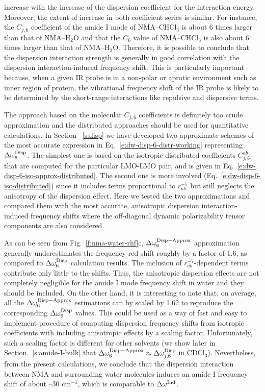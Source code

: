\documentclass[b5paper,oneside,fleqn,11pt]{book}
\begin{document}
\begin{refsection}
increase with the increase of the dispersion coefficient for the interaction
energy. Moreover, the extent of increase in both coefficient series
is similar. For instance, the $C_{j,6}$ coefficient of the
amide I mode of NMA--CHCl$_3$ is about 6 times larger than
that of NMA--H$_2$O and that the $C_6$ value of NMA--CHCl$_3$ is
also about 6 times larger than that of NMA--H$_2$O. Therefore,
it is possible to conclude that the dispersion interaction
strength is generally in good correlation with the dispersion
interaction\hyp{}induced frequency shift. This is particularly important
because, when a given IR probe is in a non\hyp{}polar or aprotic
environment such as inner region of protein, the vibrational
frequency shift of the IR probe is likely to be determined
by the short\hyp{}range interactions like repulsive and dispersive
terms.

The approach based on the molecular $C_{j,6}$ coefficients 
is definitely too crude approximation and the distributed approaches
should be used for quantitative calculations. 
In Section ~\ref{s:disp} we have developed two
approximate schemes of the most accurate expression in Eq.~\eqref{e:dw-disp-6-distr-working}
representing $\Delta\omega^{\rm Disp}_6$. The simplest
one is based on the isotropic distributed coefficients $C_{j,6}^{ab}$
that are computed for the particular LMO-LMO pair, and is given
in Eq.~\eqref{e:dw-disp-6-iso-approx-distributed}. 
The second one is more involved (Eq.~\eqref{e:dw-disp-6-iso-distributed}) since
it includes terms proportional to $r^{-7}_{ab}$ but still neglects the anisotropy
of the dispersion effect. Here we tested the two approximations
and compared them with the most accurate, anisotropic dispersion
interaction\hyp{}induced frequency shifts where
the off\hyp{}diagonal dynamic polarizability tensor components
are also considered.

As can be seen from Fig.~\ref{f:nma-water-rhf}c,
$\Delta \omega_{6}^{\rm Disp-Approx}$ approximation generally
underestimates the frequency red shift roughly by a factor of 1.6,
as compared to $\Delta\omega^{\rm Disp}_6$ calculation results.
The inclusion of $r^{-7}_{ab}$\hyp{}dependent terms contribute 
only little to the shifts. Thus, the anisotropic dispersion effects
are not completely negligible for the amide I mode frequency shift
in water and they should be included. On the other hand, it is interesting
to note that, on average, all the $\Delta \omega_{6}^{\rm Disp-Approx}$
estimations can by scaled by 1.62 to reproduce the corresponding $\Delta\omega^{\rm Disp}_6$
values. This could be used as a way of fast and easy to implement
procedure of computing dispersion frequency shifts from isotropic
coefficients with including anisotropic effects by a scaling factor.
Unfortunately, such a scaling
factor is different for other solvents 
(we show later in Section.~\ref{s:amide-I-bulk} that 
$\Delta \omega_{6}^{\rm Disp-Approx}\approx\Delta \omega_{j,6}^{\rm Disp}$
in CDCl$_3$). 
Nevertheless, from the present calculations, we conclude that the dispersion
interaction between NMA and surrounding water molecules
induces an amide I frequency shift of about --30 cm$^{-1}$, which is
comparable to $\Delta \omega^{\rm Ind}$.


\end{refsection}
\end{document}
